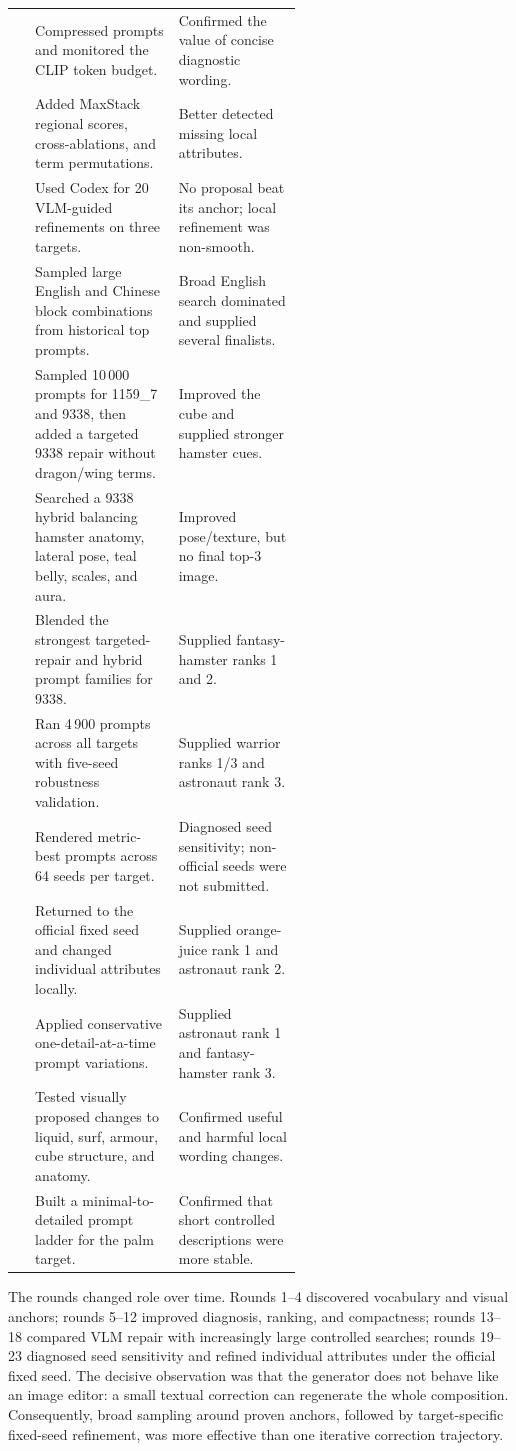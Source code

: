 \documentclass[runningheads]{llncs}
\begin{document}
\begin{table}[H]
\begin{tabularx}{\linewidth}{>{\centering\arraybackslash}p{0.07\linewidth}>{\raggedright\arraybackslash}p{0.50\linewidth}>{\raggedright\arraybackslash}X}
11 & Compressed prompts and monitored the CLIP token budget. & Confirmed the value of concise diagnostic wording. \\
12 & Added MaxStack regional scores, cross-ablations, and term permutations. & Better detected missing local attributes. \\
13 & Used Codex for 20 VLM-guided refinements on three targets. & No proposal beat its anchor; local refinement was non-smooth. \\
14 & Sampled large English and Chinese block combinations from historical top prompts. & Broad English search dominated and supplied several finalists. \\
15 & Sampled 10\,000 prompts for 1159\_7 and 9338, then added a targeted 9338 repair without dragon/wing terms. & Improved the cube and supplied stronger hamster cues. \\
16 & Searched a 9338 hybrid balancing hamster anatomy, lateral pose, teal belly, scales, and aura. & Improved pose/texture, but no final top-3 image. \\
17 & Blended the strongest targeted-repair and hybrid prompt families for 9338. & Supplied fantasy-hamster ranks 1 and 2. \\
18 & Ran 4\,900 prompts across all targets with five-seed robustness validation. & Supplied warrior ranks 1/3 and astronaut rank 3. \\
19 & Rendered metric-best prompts across 64 seeds per target. & Diagnosed seed sensitivity; non-official seeds were not submitted. \\
20 & Returned to the official fixed seed and changed individual attributes locally. & Supplied orange-juice rank 1 and astronaut rank 2. \\
21 & Applied conservative one-detail-at-a-time prompt variations. & Supplied astronaut rank 1 and fantasy-hamster rank 3. \\
22 & Tested visually proposed changes to liquid, surf, armour, cube structure, and anatomy. & Confirmed useful and harmful local wording changes. \\
23 & Built a minimal-to-detailed prompt ladder for the palm target. & Confirmed that short controlled descriptions were more stable. \\
\bottomrule
\end{tabularx}
\end{table}

The rounds changed role over time. Rounds 1--4 discovered vocabulary and visual anchors; rounds 5--12 improved diagnosis, ranking, and compactness; rounds 13--18 compared VLM repair with increasingly large controlled searches; rounds 19--23 diagnosed seed sensitivity and refined individual attributes under the official fixed seed. The decisive observation was that the generator does not behave like an image editor: a small textual correction can regenerate the whole composition. Consequently, broad sampling around proven anchors, followed by target-specific fixed-seed refinement, was more effective than one iterative correction trajectory.
\end{document}
